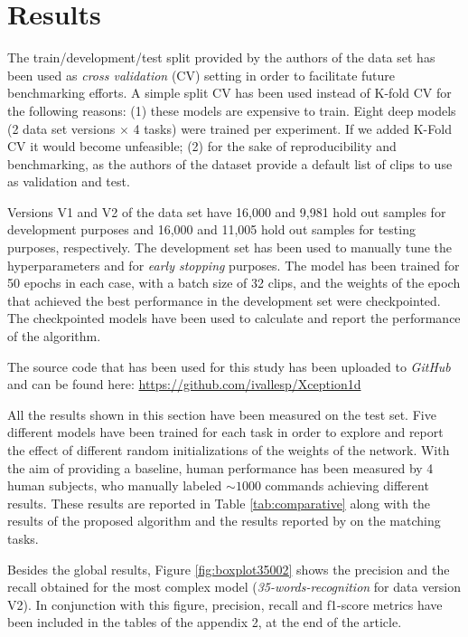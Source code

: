 \documentclass{elsarticle}
\begin{document}
\section{Results} \label{sec:results}
The train/development/test split provided by the authors of the data set \cite{speechcommands} has been used as \textit{cross validation} (CV) setting in order to facilitate future benchmarking efforts. A simple split CV has been used instead of K-fold CV for the following reasons: (1) these models are expensive to train. Eight deep models (2 data set versions $\times$ 4 tasks) were trained per experiment. If we added K-Fold CV it would become unfeasible; (2) for the sake of reproducibility and benchmarking, as the authors of the dataset provide a default list of clips to use as validation and test.

Versions V1 and V2 of the data set have 16,000 and 9,981 hold out samples for development purposes and 16,000 and 11,005 hold out samples for testing purposes, respectively. The development set has been used to manually tune the hyperparameters and for \textit{early stopping} purposes. The model has been trained for 50 epochs in each case, with a batch size of 32 clips, and the weights of the epoch that achieved the best performance in the development set were checkpointed. The checkpointed models have been used to calculate and report the performance of the algorithm.

 The source code that has been used for this study has been uploaded to \textit{GitHub} and can be found here: \url{https://github.com/ivallesp/Xception1d}

All the results shown in this section have been measured on the test set. Five different models have been trained for each task in order to explore and report the effect of different random initializations of the weights of the network. With the aim of providing a baseline, human performance has been measured by 4 human subjects, who manually labeled $\sim 1000$ commands achieving different results. These results are reported in Table \ref{tab:comparative} along with the results of the proposed algorithm and the results reported by \cite{Andrade2018, Zhang2017, McMahan2018, Warden2018} on the matching tasks.

Besides the global results, Figure \ref{fig:boxplot35002} shows the precision and the recall obtained for the most complex model (\textit{35-words-recognition} for data version V2). In conjunction with this figure, precision, recall and f1-score metrics have been included in the tables of the appendix 2, at the end of the article. 
\end{document}
